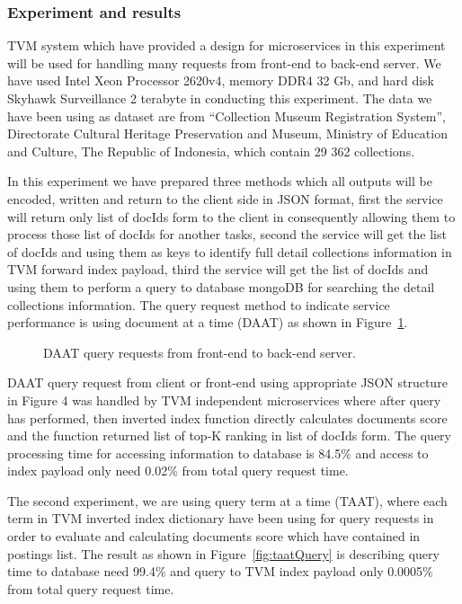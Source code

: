 \subsubsection{Experiment and results} TVM system which have provided a design for microservices in this experiment will be used for handling many requests from front-end to back-end server. We have used Intel Xeon Processor 2620v4, memory DDR4 32 Gb, and hard disk Skyhawk Surveillance 2 terabyte in conducting this experiment. The data we have been using as dataset are from “Collection Museum Registration System”, Directorate Cultural Heritage Preservation and Museum, Ministry of Education and Culture, The Republic of Indonesia, which contain 29 362 collections.

In this experiment we have prepared three methods which all outputs will be encoded, written and return to the client side in JSON format, first the service will return only list of docIds form to the client in consequently allowing them to process those list of docIds for another tasks, second the service will get the list of docIds and using them as keys to identify full detail collections information in TVM forward index payload, third the service will get the list of docIds and using them to perform a query to database mongoDB for searching the detail collections information. The query request method to indicate service performance is using document at a time (DAAT) as shown in Figure~\cref{fig:daatQuery}.

\begin{figure}[ht]
	\caption{DAAT query requests from front-end to back-end server.}\label{fig:daatQuery}
\end{figure}


DAAT query request from client or front-end using appropriate JSON structure in Figure 4 was handled by TVM independent microservices where after query has performed, then inverted index function directly calculates documents score and the function returned list of top-K ranking in list of docIds form. The query processing time for accessing information to database is 84.5\% and access to index payload only need 0.02\% from total query request time.

The second experiment, we are using query term at a time (TAAT), where each term in TVM inverted index dictionary have been using for query requests in order to evaluate and calculating documents score which have contained in postings list. The result as shown in Figure~\cref{fig:taatQuery} is describing query time to database need 99.4\% and query to TVM index payload only 0.0005\% from total query request time.

